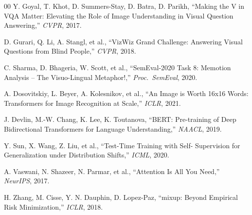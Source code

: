 \documentclass[conference]{IEEEtran}
\begin{document}
\begin{thebibliography}{00}
Y. Goyal, T. Khot, D. Summers-Stay, D. Batra, D. Parikh, ``Making the V
in VQA Matter: Elevating the Role of Image Understanding in Visual
Question Answering,'' \emph{CVPR}, 2017.

D. Gurari, Q. Li, A. Stangl, et al., ``VizWiz Grand Challenge: Answering
Visual Questions from Blind People,'' \emph{CVPR}, 2018.

C. Sharma, D. Bhageria, W. Scott, et al., ``SemEval-2020 Task 8:
Memotion Analysis -- The Visuo-Lingual Metaphor!,'' \emph{Proc.\ SemEval},
2020.

A. Dosovitskiy, L. Beyer, A. Kolesnikov, et al., ``An Image is Worth
16x16 Words: Transformers for Image Recognition at Scale,'' \emph{ICLR},
2021.

J. Devlin, M.-W. Chang, K. Lee, K. Toutanova, ``BERT: Pre-training of
Deep Bidirectional Transformers for Language Understanding,''
\emph{NAACL}, 2019.

Y. Sun, X. Wang, Z. Liu, et al., ``Test-Time Training with Self-
Supervision for Generalization under Distribution Shifts,''
\emph{ICML}, 2020.

A. Vaswani, N. Shazeer, N. Parmar, et al., ``Attention Is All You
Need,'' \emph{NeurIPS}, 2017.

H. Zhang, M. Cisse, Y. N. Dauphin, D. Lopez-Paz, ``mixup: Beyond
Empirical Risk Minimization,'' \emph{ICLR}, 2018.

\end{thebibliography}
\end{document}
